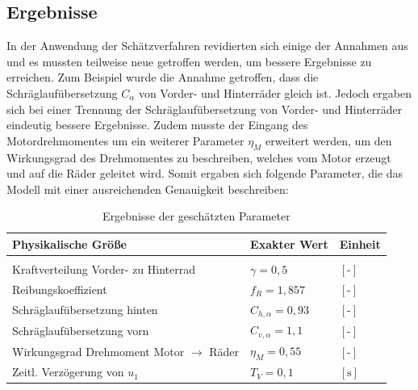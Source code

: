 \subsection{Ergebnisse}
In der Anwendung der Schätzverfahren revidierten sich einige der Annahmen aus \cite{VikAnd} und es mussten teilweise neue getroffen werden, um bessere Ergebnisse zu erreichen. Zum Beispiel wurde die Annahme getroffen, dass die Schräglaufübersetzung $C_{\alpha}$ von Vorder- und Hinterräder gleich ist. Jedoch ergaben sich bei einer Trennung der Schräglaufübersetzung von Vorder- und Hinterräder eindeutig bessere Ergebnisse. Zudem musste der Eingang des Motordrehmomentes um ein weiterer Parameter $\eta_M$ erweitert werden, um den Wirkungsgrad des Drehmomentes zu beschreiben, welches vom Motor erzeugt und auf die Räder geleitet wird. Somit ergaben sich folgende Parameter, die das Modell mit einer ausreichenden Genauigkeit beschreiben: 
\begin{table}[H]
\centering
\begin{tabularx}{\columnwidth}{m{7cm}|m{4cm}|X}
  \textbf{Physikalische Größe} & \textbf{Exakter Wert}& \textbf{Einheit}\\\hline\hline 
	\rule{0pt}{1mm} & &\\
	Kraftverteilung Vorder- zu Hinterrad& $\gamma=0,5$ & $[\text{-}]$\\
	Reibungskoeffizient& $f_R=1,857$ & $[\text{-}]$\\
	Schräglaufübersetzung hinten& $C_{h,\alpha}=0,93$ & $[\text{-}]$\\
  	Schräglaufübersetzung vorn& $C_{v,\alpha}=1,1$ & $[\text{-}]$\\
  	Wirkungsgrad Drehmoment Motor $\rightarrow$ Räder& $\eta_M=0,55$ & $[\text{-}]$\\
	Zeitl. Verzögerung von $u_{1}$& $T_{V}=0,1$ & $[\text{s}]$
\end{tabularx}
\caption{Ergebnisse der geschätzten Parameter \label{tab:ParSch}}
\end{table} 


